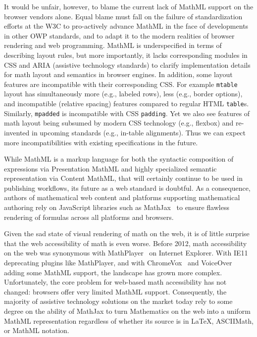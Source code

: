 \documentclass{sig-alternate}
\begin{document}
It would be unfair, however, to blame the current lack of MathML support on the
browser vendors alone. Equal blame must fall on the failure of standardization
efforts at the W3C to pro-actively advance MathML in the face of developments in
other OWP standards, and to adapt it to the modern realities of browser
rendering and web programming. MathML is underspecified in terms of describing
layout rules, but more importantly, it lacks corresponding modules in CSS and
ARIA (assistive technology standards) to clarify implementation details for math
layout and semantics in browser engines.  In addition, some layout features are
incompatible with their corresponding CSS.  For example \texttt{mtable}
layout has simultaneously more (e.g., labeled rows), less (e.g., border
options), and incompatible (relative spacing) features compared to regular HTML
\texttt{table}s.  Similarly, \texttt{mpadded} is incompatible with CSS
\texttt{padding}.  Yet we also see features of math layout being subsumed by
modern CSS technology (e.g., flexbox) and re-invented in upcoming standards
(e.g., in-table alignments).  Thus we can expect more incompatibilities with
existing specifications in the future.

While MathML is a markup language for both the syntactic composition of
expressions via Presentation MathML and highly specialized semantic
representation via Content MathML, that will certainly continue to be used in
publishing workflows, its future as a web standard is doubtful.  As a
consequence, authors of mathematical web content and platforms supporting
mathematical authoring rely on JavaScript libraries such as
MathJax~\cite{MathJax2.5} to ensure flawless rendering of formulas across all
platforms and browsers.

Given the sad state of visual rendering of math on the web, it is of little
surprise that the web accessibility of math is even worse.  Before 2012, math
accessibility on the web was synonymous with
MathPlayer~\cite{soiffer2005mathplayer} on Internet Explorer. With IE11
deprecating plugins like MathPlayer, and with ChromeVox~\cite{Sorge14} and
VoiceOver~\cite{voiceover} adding some MathML support, the landscape has grown more
complex. Unfortunately, the core problem for web-based math accessibility has
not changed: browsers offer very limited MathML support. Consequently, the
majority of assistive technology solutions on the market today rely to some
degree on the ability of MathJax to turn Mathematics on the web into a uniform
MathML representation regardless of whether its source is in {\LaTeX}, ASCIIMath,
or MathML notation.
\end{document}
